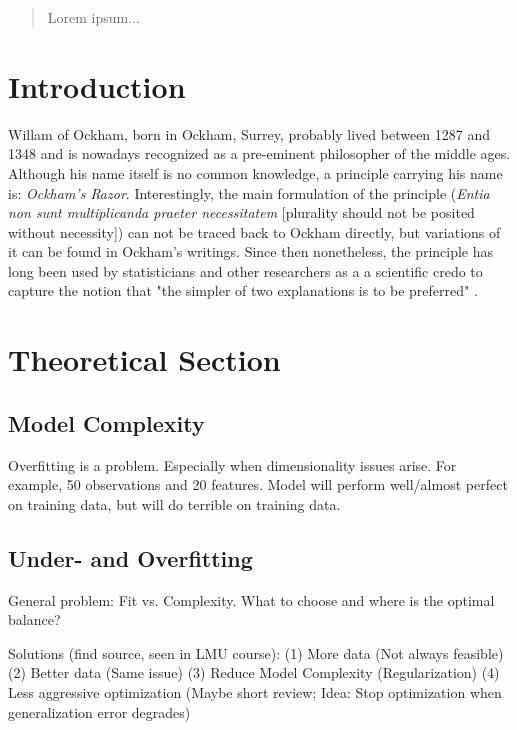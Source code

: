 \documentclass[12pt,a4paper]{article}
\begin{document}
\begin{abstract}
Lorem ipsum...
\end{abstract}

\clearpage
\thispagestyle{plain}
\tableofcontents
\pagebreak
{}

\pagebreak
\section{Introduction}
Willam of Ockham, born in Ockham, Surrey, probably lived between 1287 and 1348 and is nowadays recognized as a pre-eminent philosopher of the middle ages. Although     his name itself is no common knowledge, a principle carrying his name is: \textit{Ockham's Razor}. Interestingly, the main formulation of the principle (\textit{Entia non sunt multiplicanda praeter necessitatem} [plurality should not be posited without necessity]) can not be traced back to Ockham directly, but variations of it can be found in Ockham's writings. Since then nonetheless, the principle has long been used by statisticians and other researchers as a a scientific credo to capture the notion that "the simpler of two explanations is to be preferred" \parencite{Lazar2010}.  

\section{Theoretical Section}\label{sec:theorysuper}
\subsection{Model Complexity}
Overfitting is a problem. Especially when dimensionality issues arise. For example, 50 observations and 20 features. Model will perform well/almost perfect on training data, but will do terrible on training data.\\
\subsection{Under- and Overfitting}

General problem: Fit vs. Complexity. What to choose and where is the optimal balance?

Solutions (find source, seen in LMU course): (1) More data (Not always feasible) (2) Better data (Same issue) (3) Reduce Model Complexity (Regularization) (4) Less aggressive optimization (Maybe short review; Idea: Stop optimization when generalization error degrades)
\end{document}

